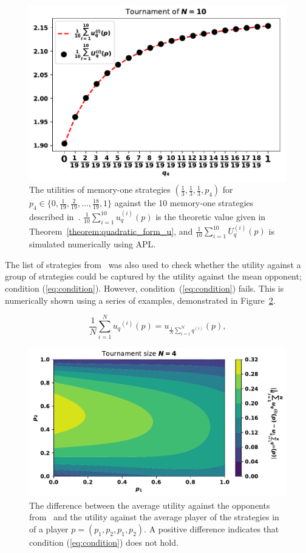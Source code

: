 \begin{figure}[!htbp]
    \begin{center}
    \includegraphics[width=.5\linewidth]{src/chapters/05/paper/memory-size-in-the-prisoners-dilemma/img/Stewart_tournament_results.pdf}
    \caption{The utilities of memory-one strategies \((\frac{1}{3}, \frac{1}{3}, \frac{1}{3}, p_4)\) for
    \(p_4 \in \{0,  \frac{1}{19}, \frac{2}{19}, \dots, \frac{18}{19}, 1\}\)
    against the 10 memory-one strategies described in~\cite{Stewart2012}.
    \(\frac{1}{10} \sum^{10}_{i=1} u_q^{(i)}(p)\) is the theoretic value given in
    Theorem~\ref{theorem:quadratic_form_u},
    and \(\frac{1}{10} \sum^{10}_{i=1} U_q^{(i)}(p)\) is simulated numerically
    using APL.}
    \label{fig:stewart_plotkin_results}
    \end{center}
\end{figure}

The list of strategies from~\cite{Stewart2012} was also used to check whether
the utility against a group of strategies could be captured by the utility
against the mean opponent; condition (\ref{eq:condition}).
However, condition~(\ref{eq:condition}) fails. This is numerically shown using
a series of examples, demonstrated in
Figure~\ref{fig:hypothesis}.

\begin{equation}\label{eq:condition}
    \frac{1}{N} \sum_{i=1} ^ {N} {u_q}^{(i)} (p) = u_{\frac {1}{N} \sum\limits_{i=1} ^ N q^{(i)}}(p),
\end{equation}

\begin{figure}[!htbp]
    \begin{center}
    \includegraphics[width=.6\linewidth]{src/chapters/05/paper/memory-size-in-the-prisoners-dilemma/img/mean_vs_average_heatmap.pdf}
    \end{center}
    \caption{The difference between the average utility against the opponents
    from~\cite{Stewart2012} and the utility against the average player of the
    strategies in~\cite{Stewart2012} of a player \(p=(p_1, p_2, p_1, p_2)\). A
    positive difference indicates that condition (\ref{eq:condition}) does not
    hold.}
    \label{fig:hypothesis}
\end{figure}

